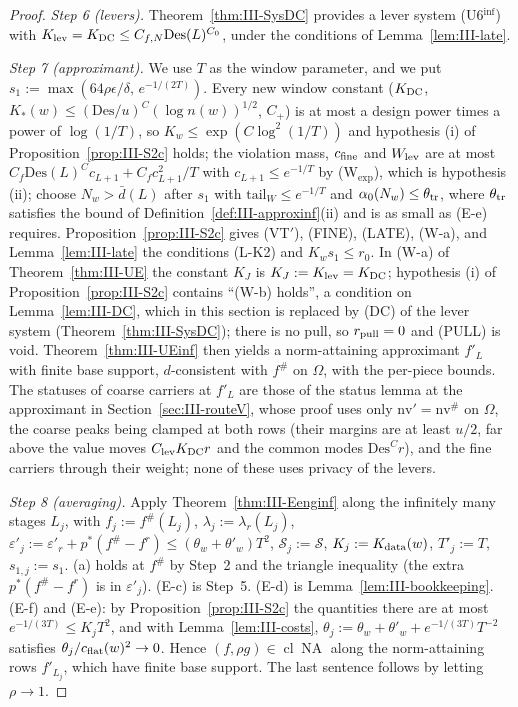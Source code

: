 \documentclass[10pt]{amsart}
\theoremstyle{definition}
\theoremstyle{remark}
\newcommand{\NA}{\operatorname{NA}}
\newcommand{\cl}{\operatorname{cl}}
\begin{document}
\begin{proof}
\emph{Step 6 (levers).}  Theorem~\ref{thm:III-SysDC} provides a lever system
(U6$^{\inf}$) with $K_{\rm lev}=K_{\rm DC}\le C_{f,N}\mathrm{Des}(L)^{C_0}$, under
the conditions of Lemma~\ref{lem:III-late}.

\emph{Step 7 (approximant).}  We use $T$ as the window parameter, and we put
$s_1:=\max(64\rho\epsilon/\delta,\,e^{-1/(2T)})$.  Every new window constant ($K_{\rm DC}$,
$K_*(w)\le(\mathrm{Des}/u)^C(\log n(w))^{1/2}$, $C_+$) is at most a design
power times a power of $\log(1/T)$, so $K_w\le\exp(C\log^2(1/T))$ and
hypothesis (i) of Proposition~\ref{prop:III-S2c} holds; the violation mass,
$c_{\rm fine}$ and $W_{\rm lev}$ are at most $C_f\mathrm{Des}(L)^Cc_{L+1}+
C_fc_{L+1}^2/T$ with $c_{L+1}\le e^{-1/T}$ by (W$_{\exp}$), which is hypothesis
(ii); choose $N_w>\bar d(L)$ after $s_1$ with $\mathrm{tail}_W\le e^{-1/T}$ and
$\alpha_0(N_w)\le\theta_{\rm tr}$, where $\theta_{\rm tr}$ satisfies the bound
of Definition~\ref{def:III-approxinf}(ii) and is as small as (E-e) requires.
Proposition~\ref{prop:III-S2c} gives (VT$'$),
(FINE), (LATE), (W-a), and Lemma~\ref{lem:III-late} the conditions (L-K2) and
$K_ws_1\le r_0$.  In (W-a) of Theorem~\ref{thm:III-UE} the constant $K_J$ is
$K_J:=K_{\rm lev}=K_{\rm DC}$; hypothesis (i) of Proposition~\ref{prop:III-S2c}
contains ``(W-b) holds'', a condition on Lemma~\ref{lem:III-DC}, which in this
section is replaced by (DC) of the lever system (Theorem~\ref{thm:III-SysDC});
there is no pull, so $r_{\rm pull}=0$ and (PULL) is void.  Theorem~\ref{thm:III-UEinf} then yields a norm-attaining
approximant $f'_L$ with finite base support, $d$-consistent with $f^\#$ on
$\Omega$, with the per-piece bounds.  The statuses of coarse carriers at $f'_L$
are those of the status lemma at the approximant in Section~\ref{sec:III-routeV},
whose proof uses only $\mathrm{nv}'=\mathrm{nv}^\#$ on $\Omega$, the coarse peaks
being clamped at both rows (their margins are at least $u/2$, far above
the value moves $C_{\rm lev}K_{\rm DC}r$ and the common modes
$\mathrm{Des}^Cr$), and the fine
carriers through their weight; none of these uses privacy of the levers.

\emph{Step 8 (averaging).}  Apply Theorem~\ref{thm:III-Eenginf} along the
infinitely many stages $L_j$, with $f_j:=f^\#(L_j)$, $\lambda_j:=\lambda_r(L_j)$,
$\varepsilon'_j:=\varepsilon'_r+p^*(f^\#-f^r)\le(\theta_w+\theta'_w)T^2$,
$\mathcal S_j:=\mathcal S$, $K_j:=K_{\rm data}(w)$, $T'_j:=T$, $s_{1,j}:=s_1$.
(a) holds at $f^\#$ by Step~2 and the triangle inequality (the extra
$p^*(f^\#-f^r)$ is in $\varepsilon'_j$).  (E-c) is Step~5.  (E-d) is
Lemma~\ref{lem:III-bookkeeping}.  (E-f) and (E-e): by
Proposition~\ref{prop:III-S2c} the quantities there are at most $e^{-1/(3T)}\le
K_jT^2$, and with Lemma~\ref{lem:III-costs}, $\theta_j:=\theta_w+\theta'_w+
e^{-1/(3T)}T^{-2}$ satisfies $\theta_j/c_{\rm flat}(w)^2\to0$.  Hence $(f,\rho g)
\in\cl\NA$ along the norm-attaining rows $f'_{L_j}$, which have finite base
support.  The last sentence follows by letting $\rho\to1$.
\end{proof}
\end{document}
